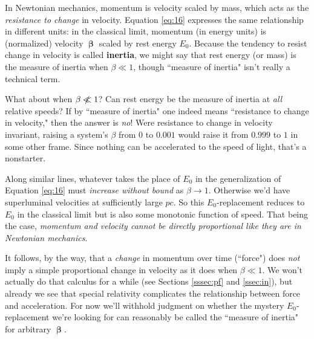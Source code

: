 \documentclass[12pt]{article}
\newcommand{\vvbeta}{\bm{\upbeta}}
\begin{document}
In Newtonian mechanics, momentum is velocity scaled by mass, which acts as the \emph{resistance to change} in velocity. Equation \ref{eq:16} expresses the same relationship in different units: in the classical limit, momentum (in energy units) is (normalized) velocity $\vvbeta$ scaled by rest energy $E_0$. Because the tendency to resist change in velocity is called \textbf{inertia}, we might say that rest energy (or mass) is the measure of inertia when $\beta \ll 1$, though ``measure of inertia" isn't really a technical term.

What about when $\beta \centernot{\ll} 1$? Can rest energy be the measure of inertia at \emph{all} relative speeds? If by ``measure of inertia" one indeed means ``resistance to change in velocity," then the answer is \emph{no}! Were resistance to change in velocity invariant, raising a system's $\beta$ from $0$ to $0.001$ would raise it from $0.999$ to $1$ in some other frame. Since nothing can be accelerated to the speed of light, that's a nonstarter.

Along similar lines, whatever takes the place of $E_0$ in the generalization of Equation \ref{eq:16} must \emph{increase without bound} as $\beta \rightarrow 1$. Otherwise we'd have superluminal velocities at sufficiently large $p c$. So this $E_0$-replacement reduces to $E_0$ in the classical limit but is also some monotonic function of speed. That being the case, \emph{momentum and velocity cannot be directly proportional like they are in Newtonian mechanics}.

It follows, by the way, that a \emph{change} in momentum over time (``force") does \emph{not} imply a simple proportional change in velocity as it does when $\beta \ll 1$. We won't actually do that calculus for a while (see Sections \ref{sssec:pf} and \ref{ssec:in}), but already we see that special relativity complicates the relationship between force and acceleration. For now we'll withhold judgment on whether the mystery $E_0$-replacement we're looking for can reasonably be called the ``measure of inertia" for arbitrary $\vvbeta$.
\end{document}
